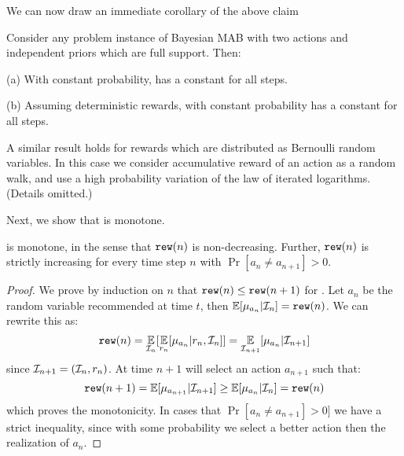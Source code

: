We can now draw an immediate corollary of the above claim

\begin{corollary}
Consider any problem instance of Bayesian MAB with two actions and independent
priors which are full support. Then:
\begin{OneLiners}
\item[(a)] With constant probability, \StaticGreedy  has a constant \BIR for all steps.
\item[(b)] Assuming deterministic rewards, with
constant probability \DynGreedy has a constant \BIR for all steps.
\end{OneLiners}
\end{corollary}

\begin{remark}
A similar result holds for  rewards which are distributed as
Bernoulli random variables. In this case we consider accumulative
reward of an action as a random walk, and use a high probability
variation of the law of iterated logarithms. (Details omitted.)
\end{remark}


Next, we show that \DynGreedy is monotone.

\begin{lemma}\label{dgmono}
\DynGreedy is monotone, in the sense that $\mathtt{rew}(n)$ is non-decreasing.
Further, $\mathtt{rew}(n)$ is strictly increasing for every time step $n$ with $\Pr[a_n\neq a_{n+1}]>0$.
\end{lemma}

\begin{proof}
We prove by induction on $n$ that $\mathtt{rew}(n)\leq \mathtt{rew}(n+1)$ for
\DynGreedy. Let $a_n$ be the random variable recommended at time
$t$, then $\E[\mu_{a_n}| \mI_n ]=\rew(n)$. We can rewrite this as:
\[
\rew(n)=\E_{\mI_n}[\E_{r_n}[\mu_{a_n}|r_n,\mI_n]] =
\E_{\mI_{n+1}}[\mu_{a_n}|\mI_{n+1}]
\]
since $\mathcal{I}_{n+1}=(\mathcal{I}_n,r_n)$. At time $n+1$ \DynGreedy will select
an action $a_{n+1}$ such that:
\[
\rew(n+1)=\E[\mu_{a_{n+1}}|\mI_{n+1}]\geq \E[\mu_{a_n}
|\mI_n]=\rew(n)
\]
%
which proves the monotonicity. In cases that $\Pr[a_n\neq
a_{n+1}]>0]$ we have a strict inequality, since with some
probability we select a better action then the realization of $a_n$.
\end{proof}


